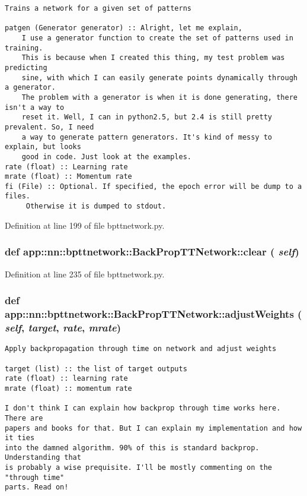 \footnotesize\begin{verbatim}Trains a network for a given set of patterns

patgen (Generator generator) :: Alright, let me explain,
    I use a generator function to create the set of patterns used in training.
    This is because when I created this thing, my test problem was predicting
    sine, with which I can easily generate points dynamically through a generator.
    The problem with a generator is when it is done generating, there isn't a way to
    reset it. Well, I can in python2.5, but 2.4 is still pretty prevalent. So, I need
    a way to generate pattern generators. It's kind of messy to explain, but looks
    good in code. Just look at the examples.
rate (float) :: Learning rate
mrate (float) :: Momentum rate
fi (File) :: Optional. If specified, the epoch error will be dump to a files. 
     Otherwise it is dumped to stdout.
\end{verbatim}
\normalsize
 

Definition at line 199 of file bpttnetwork.py.
\subsubsection{\setlength{\rightskip}{0pt plus 5cm}def app::nn::bpttnetwork::BackPropTTNetwork::clear ( {\em self})}\label{classapp_1_1nn_1_1bpttnetwork_1_1BackPropTTNetwork_a0cd91ec461f4b501e8f51022db74ebf}




Definition at line 235 of file bpttnetwork.py.
\subsubsection{\setlength{\rightskip}{0pt plus 5cm}def app::nn::bpttnetwork::BackPropTTNetwork::adjustWeights ( {\em self},  {\em target},  {\em rate},  {\em mrate})}\label{classapp_1_1nn_1_1bpttnetwork_1_1BackPropTTNetwork_787d886cd117a7423e0b45fb1e9ddf26}




\footnotesize\begin{verbatim}Apply backpropagation through time on network and adjust weights

target (list) :: the list of target outputs
rate (float) :: learning rate
mrate (float) :: momentum rate

I don't think I can explain how backprop through time works here. There are
papers and books for that. But I can explain my implementation and how it ties
into the damned algorithm. 90% of this is standard backprop. Understanding that
is probably a wise prequisite. I'll be mostly commenting on the "through time"
parts. Read on!
\end{verbatim}
\normalsize
 


